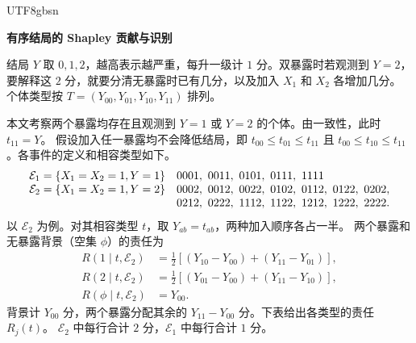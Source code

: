 \documentclass[11pt,a4paper]{article}
\newcommand{\headingweight}{\ifPDFTeX\mdseries\else\bfseries\fi}
\begin{document}
\ifPDFTeX\begin{CJK*}{UTF8}{gbsn}\fi
\begin{center}
  {\LARGE\headingweight 有序结局的 Shapley 贡献与识别}
\end{center}

结局 $Y$ 取 $0,1,2$，越高表示越严重，每升一级计 $1$ 分。双暴露时若观测到 $Y=2$，
要解释这 $2$ 分，就要分清无暴露时已有几分，以及加入 $X_1$ 和 $X_2$ 各增加几分。
个体类型按 $T=(Y_{00},Y_{01},Y_{10},Y_{11})$ 排列。

本文考察两个暴露均存在且观测到 $Y=1$ 或 $Y=2$ 的个体。由一致性，此时 $t_{11}=Y$。
假设加入任一暴露均不会降低结局，即 $t_{00}\le t_{01}\le t_{11}$ 且
$t_{00}\le t_{10}\le t_{11}$。各事件的定义和相容类型如下。
\[
\begin{array}{@{}l@{\quad}l@{}}
 \mathcal E_1=\{X_1=X_2=1,Y=1\} & 0001,\ 0011,\ 0101,\ 0111,\ 1111\\
 \mathcal E_2=\{X_1=X_2=1,Y=2\} & 0002,\ 0012,\ 0022,\ 0102,\ 0112,\ 0122,\ 0202,\\
 & 0212,\ 0222,\ 1112,\ 1122,\ 1212,\ 1222,\ 2222 .
\end{array}
\]
以 $\mathcal E_2$ 为例。对其相容类型 $t$，取 $Y_{ab}=t_{ab}$，两种加入顺序各占一半。
两个暴露和无暴露背景（空集 $\phi$）的责任为
\[
\begin{aligned}
 R(1\mid t,\mathcal E_2)&=\tfrac12[(Y_{10}-Y_{00})+(Y_{11}-Y_{01})],\\
 R(2\mid t,\mathcal E_2)&=\tfrac12[(Y_{01}-Y_{00})+(Y_{11}-Y_{10})],\\
 R(\phi\mid t,\mathcal E_2)&=Y_{00}.
\end{aligned}
\]
背景计 $Y_{00}$ 分，两个暴露分配其余的 $Y_{11}-Y_{00}$ 分。下表给出各类型的责任 $R_j(t)$。
$\mathcal E_2$ 中每行合计 $2$ 分，$\mathcal E_1$ 中每行合计 $1$ 分。


\end{CJK*}
\end{document}
